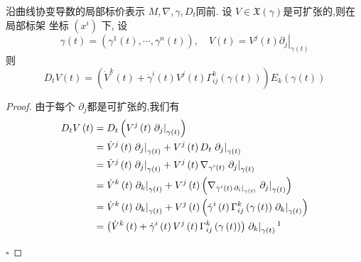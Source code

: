 \documentclass[../../main.tex]{subfiles}
\begin{document}
\begin{proposition}{沿曲线协变导数的局部标价表示}
     \(  M, \nabla , \gamma ,D_{t}  \)同前. 设 \(  V\in \mathfrak{X}\left(  \gamma  \right)   \)是可扩张的,则在局部标架 坐标 \(  \left( x^{i} \right)   \) 下, 设 \[
     \gamma \left( t \right)= \left(  \gamma ^{1}\left( t \right),\cdots , \gamma ^{n}\left( t \right)   \right)  ,\quad       V\left( t \right)= V^{j}\left( t \right)\left.  \partial _{j} \right|_{ \gamma \left( t \right) }
     \]则 \[
     D_{t}V\left( t \right)= \left(  \dot{V}^{k}\left( t \right) +  \dot{\gamma}^{i}\left( t \right)   V^{j}\left( t \right)  \Gamma _{ij}^{k}\left(  \gamma \left( t \right)  \right) \right) E_{k}\left(  \gamma \left( t \right)  \right) 
     \]
\end{proposition}
\begin{proof}
    由于每个 \(  \partial _{j}  \)都是可扩张的,我们有 \[
    \begin{aligned}
    D_{t}V\left( t \right)& =   D_{t}\left( V^{j}\left( t \right)\left. \partial _{j} \right|_{ \gamma \left( t \right) }  \right)   \\ 
     & =  \dot{V}^{j}\left( t \right)\left. \partial _{j} \right|_{ \gamma \left( t \right) } +   V^{j}\left( t \right) D_{t}\left. \partial _{j} \right|_{ \gamma \left( t \right) }  \\ 
      & =  \dot{V}^{j}\left( t \right)\left. \partial _{j} \right|_{ \gamma \left( t \right) } +  V^{j}\left( t \right)  \nabla _{ \gamma ^{\prime} \left( t \right) } \left. \partial _{j} \right|_{ \gamma \left( t \right) }\\ 
       & =  \dot{V}^{k}\left( t \right) \left. \partial _{k} \right|_{ \gamma \left( t \right) } +  V^{j}\left( t \right)\left(  \nabla _{ \dot{\gamma}^{i}\left( t \right)\left. \partial _{i} \right|_{ \gamma \left( t \right) } }\left. \partial _{j} \right|_{ \gamma \left( t \right) } \right)     \\ 
        & =  \dot{V}^{k}\left( t \right) \left. \partial _{k} \right|_{ \gamma \left( t \right) } +   V^{j}\left( t \right) \left(  \dot{\gamma}^{i}\left( t \right)  \Gamma _{ij}^{k} \left(  \gamma \left( t \right)  \right)\left. \partial _{k} \right|_{ \gamma \left( t \right) }   \right)  \\ 
         & =  \left( \dot{V}^{k}\left( t \right) +  \dot{\gamma}^{i}\left( t \right)V^{j}\left( t \right)  \Gamma _{ij}^{k} \left(  \gamma \left( t \right)  \right)     \right) \left. \partial _{k} \right|_{ \gamma \left( t \right) } 
        \footnotemark 
    \end{aligned}
    \] 

    \hfill $\square$
\end{proof}
\end{document}
